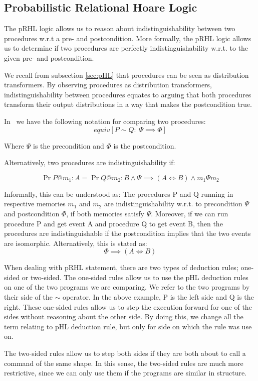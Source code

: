 \subsection{Probabilistic Relational Hoare Logic}
\label{sec:pRHL}
The pRHL logic allows us to reason about indistinguishability between two
procedures w.r.t a pre- and postcondition. More formally, the pRHL logic
allows us to determine if two procedures are perfectly indistinguishability w.r.t.
to the given pre- and postcondition.

We recall from subsection \ref{sec:pHL} that procedures can be seen as distribution
transformers. By observing procedures as distribution transformers,
indistinguishability between procedures equates to arguing that both procedures
transform their output distributions in a way that makes the postcondition
true.

In \easycrypt\ we have the following notation for comparing two procedures:
\[
  equiv[P \sim Q :\; \Psi \implies \Phi ]
\]

Where $\Psi$ is the precondition and $\Phi$ is the postcondition.

Alternatively, two procedures are indistinguishability if:

\[
  \Pr{P @ m_{1} : A} = \Pr{Q @ m_{2} : B} \land \Psi \implies (A \iff B) \land m_{1} \Psi m_{2}
\]

Informally, this can be understood as: The procedures P and Q running in
respective memories $m_{1}$ and $m_{2}$ are indistinguishability w.r.t. to
precondition $\Psi$ and postcondition $\Phi$, if both memories satisfy $\Psi$.
Moreover, if we can run procedure P and get event A and
procedure Q to get event B, then the procedures are indistinguishable if the
postcondition implies that the two events are isomorphic. Alternatively, this is
stated as:
\[
  \Phi \implies (A \iff B)
\]


When dealing with pRHL statement, there are two types of deduction rules;
one-sided or two-sided.
The one-sided rules allow us to use the pHL deduction rules on one of the
two programs we are comparing. We refer to the two programs by their
side of the $\sim$ operator. In the above example, P is the left side and Q is
the right.
These one-sided rules allow us to step the execution forward for one of the sides without
reasoning about the other side.
By doing this, we change all the term relating to pHL deduction rule, but only
for side on which the rule was use on.

The two-sided rules allow us to step both sides if they are both about to call
a command of the same shape. In this sense, the two-sided rules are much more
restrictive, since we can only use them if the programs are similar in structure.

